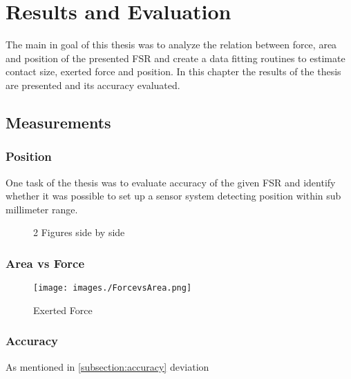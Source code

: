 \chapter{Results and Evaluation}
\label{ch:results}
The main in goal of this thesis was to analyze the relation between force, area and position of the presented FSR and create a data fitting routines to estimate contact size, exerted force and position. In this chapter the results of the thesis are presented and its accuracy evaluated.


\section{Measurements}



\subsection{Position}

One task of the thesis was to evaluate accuracy of the given FSR and identify whether it was possible to set up a sensor system detecting position within sub millimeter range.

\begin{figure}%
    \centering
    \label{fig:rawpos}
    \qquad
    \caption{2 Figures side by side}%
    \label{fig:positions}%
\end{figure}

\subsection{Area vs Force}

\begin{figure}[htp]
    \centering
    \texttt{[image: images./ForcevsArea.png]}
    \caption[Area Detection]{Exerted Force }
    \label{fig:operatingmode}
\end{figure}  

\subsection{Accuracy}




As mentioned in \ref{subsection:accuracy} deviation 

